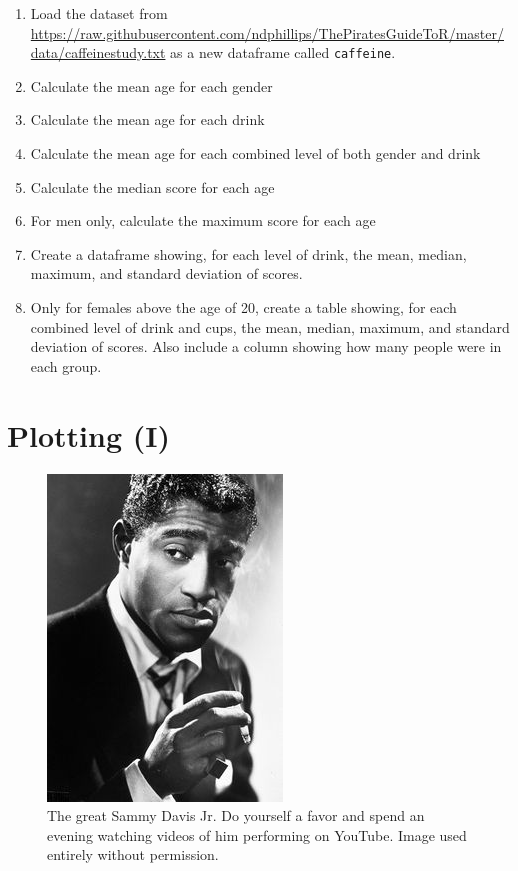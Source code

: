 \documentclass[]{book}
\theoremstyle{definition}
\theoremstyle{definition}
\theoremstyle{remark}
\begin{document}
\begin{enumerate}
\def\labelenumi{\arabic{enumi}.}
\item
  Load the dataset from
  \url{https://raw.githubusercontent.com/ndphillips/ThePiratesGuideToR/master/data/caffeinestudy.txt}
  as a new dataframe called \texttt{caffeine}.
\item
  Calculate the mean age for each gender
\item
  Calculate the mean age for each drink
\item
  Calculate the mean age for each combined level of both gender and
  drink
\item
  Calculate the median score for each age
\item
  For men only, calculate the maximum score for each age
\item
  Create a dataframe showing, for each level of drink, the mean, median,
  maximum, and standard deviation of scores.
\item
  Only for females above the age of 20, create a table showing, for each
  combined level of drink and cups, the mean, median, maximum, and
  standard deviation of scores. Also include a column showing how many
  people were in each group.
\end{enumerate}

\chapter{Plotting (I)}\label{plotting1}

\begin{figure}

{\centering \includegraphics[width=0.5\linewidth]{images/sammy} 

}

\caption{The great Sammy Davis Jr. Do yourself a favor and spend an evening watching videos of him performing on YouTube. Image used entirely without permission.}\label{fig:sammy}
\end{figure}
\end{document}
